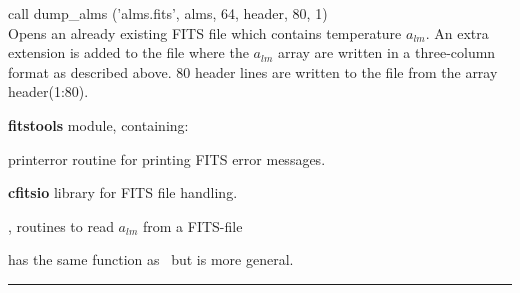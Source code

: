 \begin{example}
{
call dump\_alms ('alms.fits', alms, 64, header, 80, 1)  \\
}
{
Opens an already existing FITS file which contains temperature $a_{lm}$. An extra extension is added to the file where the $a_{lm}$ array are written in a three-column format as described above. 80 header lines are written to the file from the array header(1:80). 
}
\end{example}

\begin{modules}
  \begin{sulist}{} %
  \item[\textbf{fitstools}] module, containing:
  \item[printerror] routine for printing FITS error messages.
  \item[\textbf{cfitsio}] library for FITS file handling.		
  \end{sulist}
\end{modules}

\begin{related}
  \begin{sulist}{} %
  \item[\htmlref{fits2alms}{sub:fits2alms}, \htmlref{read\_conbintab}{sub:read_conbintab}] routines to read $a_{lm}$ from a FITS-file 
  \item[\htmlref{alms2fits}{sub:alms2fits}] has the same function as \thedocid\ but is more general.
  \end{sulist}
\end{related}

\rule{\hsize}{2mm}

\newpage
